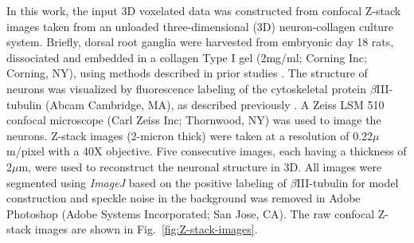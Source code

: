 \documentclass[]{interact}
\begin{document}
In this work, the input 3D voxelated data was constructed from confocal Z-stack images taken from an unloaded three-dimensional (3D) neuron-collagen culture system. Briefly, dorsal root ganglia were harvested from embryonic day 18 rats, dissociated and embedded in a collagen Type I gel (2mg/ml; Corning Inc; Corning, NY), using methods described in prior studies \citep{Cullen:2012gu, Zhang:2016ga, Zhang2017S}. The structure of neurons was visualized by fluorescence labeling of the cytoskeletal protein $\beta$III-tubulin (Abcam Cambridge, MA), as described previously \citep{Zhang:2016ga, Zhang2017S}. A Zeiss LSM 510 confocal microscope (Carl Zeiss Inc; Thornwood, NY) was used to image the neurons.  Z-stack images (2-micron thick) were taken at a resolution of 0.22$\mu$m/pixel with a 40X objective. Five consecutive images, each having a thickness of 2$\mu$m, were used to reconstruct the neuronal structure in 3D. All images were segmented using \textit{ImageJ} \citep{Schneider:2012dw} based on the positive labeling of $\beta$III-tubulin for model construction and speckle noise in the background was removed in Adobe Photoshop (Adobe Systems Incorporated; San Jose, CA). The raw confocal Z-stack images are shown in Fig.\ \ref{fig:Z-stack-images}. 
%
\end{document}
